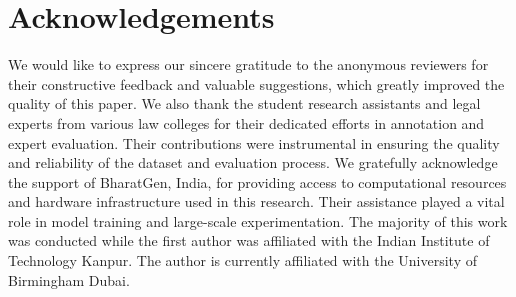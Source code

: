 \section*{Acknowledgements}

We would like to express our sincere gratitude to the anonymous reviewers for their constructive feedback and valuable suggestions, which greatly improved the quality of this paper. We also thank the student research assistants and legal experts from various law colleges for their dedicated efforts in annotation and expert evaluation. Their contributions were instrumental in ensuring the quality and reliability of the dataset and evaluation process.
We gratefully acknowledge the support of BharatGen, India, for providing access to computational resources and hardware infrastructure used in this research. Their assistance played a vital role in model training and large-scale experimentation. The majority of this work was conducted while the first author was affiliated with the Indian Institute of Technology Kanpur. The author is currently affiliated with the University of Birmingham Dubai.
